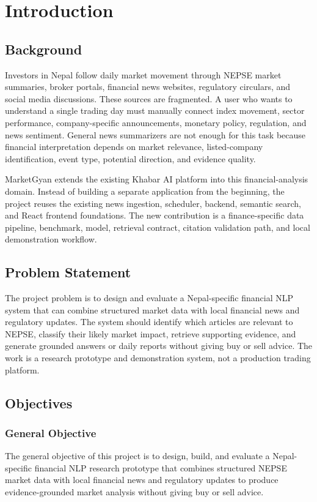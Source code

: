 \documentclass[12pt,a4paper]{report}
\begin{document}

\chapter{Introduction}

\section{Background}
Investors in Nepal follow daily market movement through NEPSE market summaries, broker portals, financial news websites, regulatory circulars, and social media discussions. These sources are fragmented. A user who wants to understand a single trading day must manually connect index movement, sector performance, company-specific announcements, monetary policy, regulation, and news sentiment. General news summarizers are not enough for this task because financial interpretation depends on market relevance, listed-company identification, event type, potential direction, and evidence quality.

MarketGyan extends the existing Khabar AI platform into this financial-analysis domain. Instead of building a separate application from the beginning, the project reuses the existing news ingestion, scheduler, backend, semantic search, and React frontend foundations. The new contribution is a finance-specific data pipeline, benchmark, model, retrieval contract, citation validation path, and local demonstration workflow.

\section{Problem Statement}
The project problem is to design and evaluate a Nepal-specific financial NLP system that can combine structured market data with local financial news and regulatory updates. The system should identify which articles are relevant to NEPSE, classify their likely market impact, retrieve supporting evidence, and generate grounded answers or daily reports without giving buy or sell advice. The work is a research prototype and demonstration system, not a production trading platform.

\section{Objectives}

\subsection{General Objective}
The general objective of this project is to design, build, and evaluate a Nepal-specific financial NLP research prototype that combines structured NEPSE market data with local financial news and regulatory updates to produce evidence-grounded market analysis without giving buy or sell advice.
\end{document}
